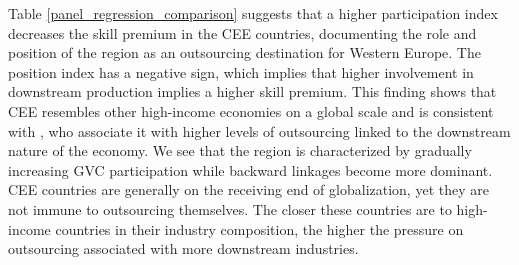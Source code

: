 \documentclass[11pt]{article}
\begin{document}
Table \ref{panel_regression_comparison} suggests that a higher participation index decreases the skill premium in the CEE countries, documenting the role and position of the region as an outsourcing destination for Western Europe. The position index has a negative sign, which implies that higher involvement in downstream production implies a higher skill premium. This finding shows that CEE resembles other high-income economies on a global scale and is consistent with \citet{coveri2024global}, who associate it with higher levels of outsourcing linked to the downstream nature of the economy. We see that the region is characterized by gradually increasing GVC participation while backward linkages become more dominant. CEE countries are generally on the receiving end of globalization, yet they are not immune to outsourcing themselves. The closer these countries are to high-income countries in their industry composition, the higher the pressure on outsourcing associated with more downstream industries.
\end{document}
